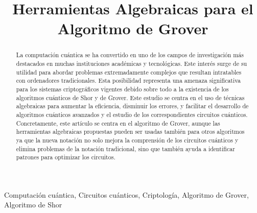 \documentclass[10pt,conference,a4paper]{IEEEtran}
\begin{document}
\title{Herramientas Algebraicas para el Algoritmo de Grover}

\author{
\and
{}
\and
{}
\and
{}
}


\maketitle


\begin{abstract}
  La computación cuántica se ha convertido en uno de los campos de investigación más destacados en muchas instituciones académicas y tecnológicas. Este interés surge de su utilidad para abordar problemas extremadamente complejos que resultan intratables con ordenadores tradicionales. Esta posibilidad representa una amenaza significativa para los sistemas criptográficos vigentes debido sobre todo a la existencia de los algoritmos cuánticos de Shor y de Grover. Este estudio se centra en el uso de técnicas algebraicas para aumentar la eficiencia, disminuir los errores, y facilitar el desarrollo de algoritmos cuánticos avanzados y el estudio de los correspondientes circuitos cuánticos. Concretamente,  este artículo se centra en el algoritmo de Grover, aunque las herramientas algebraicas propuestas pueden ser usadas también para otros algoritmos ya que la nueva notación no solo mejora la comprensión de los circuitos cuánticos y elimina problemas de la notación tradicional, sino que también ayuda a identificar patrones para optimizar los circuitos.  
\end{abstract}


\vspace{1mm}
\begin{IEEEkeywords}
Computación cuántica, Circuitos cuánticos, Criptología, Algoritmo de Grover, Algoritmo de Shor
\end{IEEEkeywords}
\end{document}
